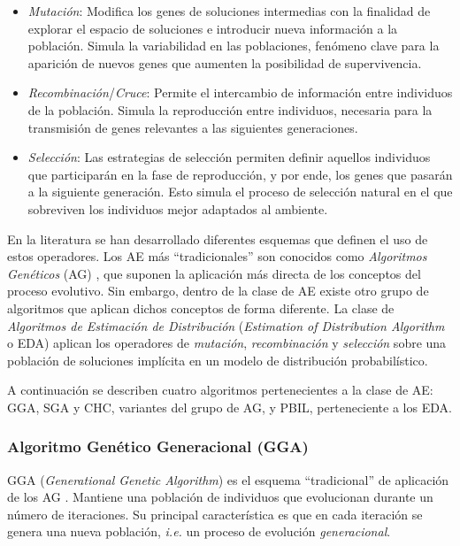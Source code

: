 \begin{itemize}
\item \emph{Mutación}: Modifica los genes de soluciones intermedias con la finalidad de explorar el espacio de soluciones e introducir nueva información a la población. Simula la variabilidad en las poblaciones, fenómeno clave para la aparición de nuevos genes que aumenten la posibilidad de supervivencia.
\item \emph{Recombinación}/\emph{Cruce}: Permite el intercambio de información entre individuos de la población. Simula la reproducción entre individuos, necesaria para la transmisión de genes relevantes a las siguientes generaciones.
\item \emph{Selección}: Las estrategias de selección permiten definir aquellos individuos que participarán en la fase de reproducción, y por ende, los genes que pasarán a la siguiente generación. Esto simula el proceso de selección natural en el que sobreviven los individuos mejor adaptados al ambiente.
\end{itemize}

En la literatura se han desarrollado diferentes esquemas que definen el uso de estos operadores. Los AE más ``tradicionales'' son conocidos como \emph{Algoritmos Genéticos} (AG) \cite{holland1975adaptation}, que suponen la aplicación más directa de los conceptos del proceso evolutivo. Sin embargo, dentro de la clase de AE existe otro grupo de algoritmos que aplican dichos conceptos de forma diferente. La clase de \emph{Algoritmos de Estimación de Distribución} (\emph{Estimation of Distribution Algorithm} o EDA) aplican los operadores de \emph{mutación}, \emph{recombinación} y \emph{selección} sobre una población de soluciones implícita en un modelo de distribución probabilístico.

A continuación se describen cuatro algoritmos pertenecientes a la clase de AE: GGA, SGA y CHC, variantes del grupo de AG, y PBIL, perteneciente a los EDA.

\subsubsection{Algoritmo Genético Generacional (GGA)}

GGA (\emph{Generational Genetic Algorithm}) es el esquema ``tradicional'' de aplicación de los AG \cite{back1996evolutionary,Muhlenbein91evolutionin}. Mantiene una población de individuos que evolucionan durante un número de iteraciones. Su principal característica es que en cada iteración se genera una nueva población, \emph{i.e.} un proceso de evolución \emph{generacional}.

